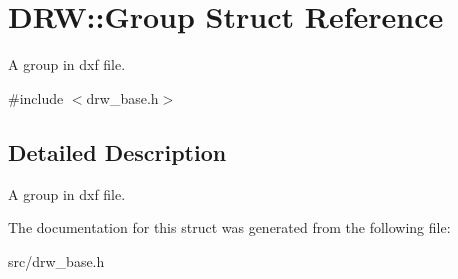 \hypertarget{struct_d_r_w_1_1_group}{}\section{D\+R\+W\+:\+:Group Struct Reference}
\label{struct_d_r_w_1_1_group}


A group in dxf file.  




{\ttfamily \#include $<$drw\+\_\+base.\+h$>$}



\subsection{Detailed Description}
A group in dxf file. 

The documentation for this struct was generated from the following file\+:\begin{DoxyCompactItemize}
\item 
src/drw\+\_\+base.\+h\end{DoxyCompactItemize}
